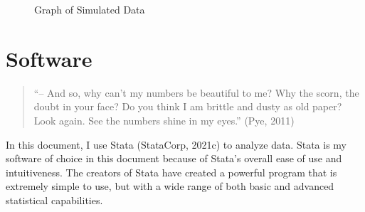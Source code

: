 \documentclass[
  letterpaper,
  DIV=11,
  numbers=noendperiod]{scrreprt}
\begin{document}
\begin{figure}


\caption{\label{fig-data}Graph of Simulated Data}

\end{figure}%


\chapter{Software}\label{sec-software}

\begin{quote}
``-- And so, why can't my numbers be beautiful to me? Why the scorn, the
doubt in your face? Do you think I am brittle and dusty as old paper?
Look again. See the numbers shine in my eyes.'' (Pye, 2011)
\end{quote}

In this document, I use Stata (StataCorp, 2021c) to analyze data. Stata
is my software of choice in this document because of Stata's overall
ease of use and intuitiveness. The creators of Stata have created a
powerful program that is extremely simple to use, but with a wide range
of both basic and advanced statistical capabilities.
\end{document}
